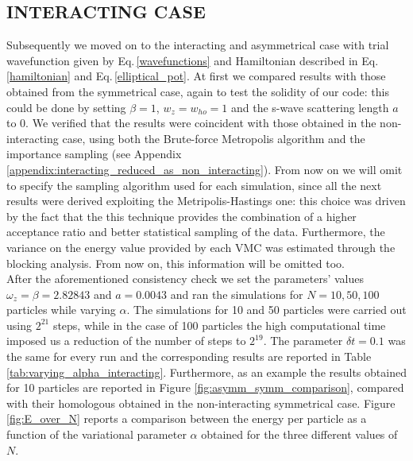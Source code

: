 \subsection{INTERACTING CASE}
Subsequently we moved on to the interacting and asymmetrical case with trial wavefunction given by Eq.\,\ref{wavefunctions} and Hamiltonian described in Eq.\,\ref{hamiltonian} and Eq.\,\ref{elliptical_pot}. At first we compared results with those obtained from the symmetrical case, again to test the solidity of our code: this could be done by setting $\beta=1$, $w_z = w_{ho} = 1$ and the s-wave scattering length $a$ to 0. We verified that the results were coincident with those obtained in the non-interacting case, using both the Brute-force Metropolis algorithm and the importance sampling (see Appendix \ref{appendix:interacting_reduced_as_non_interacting}). From now on we will omit to specify the sampling algorithm used for each simulation, since all the next results were derived exploiting the Metripolis-Hastings one: this choice was driven by the fact that the this technique provides the combination of a higher acceptance ratio and better statistical sampling of the data. Furthermore, the variance on the energy value provided by each VMC was estimated through the blocking analysis. From now on, this information will be omitted too. \\

After the aforementioned consistency check we set the parameters' values $\omega_z = \beta = 2.82843$ and $a = 0.0043$ and ran the simulations for $N=10,50,100$ particles while varying $\alpha$. The simulations for 10 and 50 particles were carried out using $2^{21}$ steps, while in the case of 100 particles the high computational time imposed us a reduction of the number of steps to $2^{19}$. The parameter $\delta t = 0.1$ was the same for every run and the corresponding results are reported in Table \ref{tab:varying_alpha_interacting}. Furthermore, as an example the results obtained for 10 particles are reported in Figure \ref{fig:asymm_symm_comparison}, compared with their homologous obtained in the non-interacting symmetrical case. Figure \ref{fig:E_over_N} reports a comparison between the energy per particle as a function of the variational parameter $\alpha$ obtained for the three different values of $N$. \\


